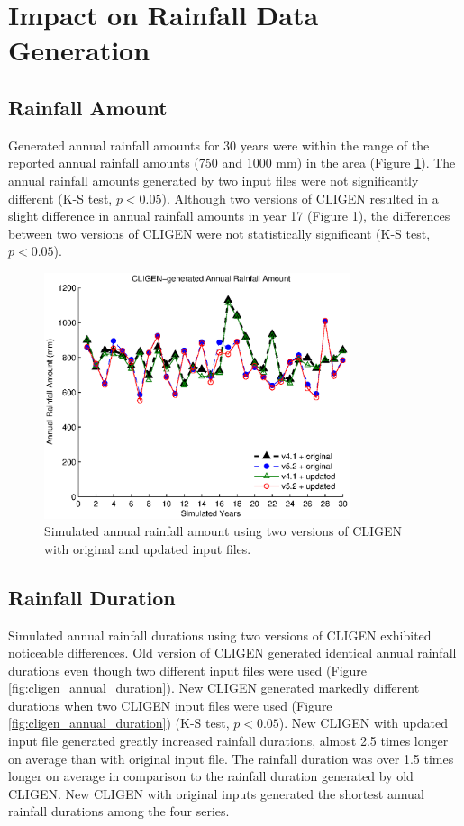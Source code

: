 \section{Impact on Rainfall Data Generation}
\label{sec:RainfallSimulation}

\subsection{Rainfall Amount}
Generated annual rainfall amounts for 30 years were within the range of the
reported annual rainfall amounts (750 and 1000 mm) in the area (Figure
\ref{fig:cligen_annual_amount}). The annual rainfall amounts generated by two
input files were not significantly different (K-S test, $p<0.05$). Although two
versions of CLIGEN resulted in a slight difference in annual rainfall amounts in
year 17 (Figure \ref{fig:cligen_annual_amount}), the differences between two
versions of CLIGEN were not statistically significant (K-S test, $p<0.05$).

\begin{figure}[htbp]
  \centering

\includegraphics[width=0.8\textwidth]{./img/cligen_annual_amount_series}
  \caption{Simulated annual rainfall amount using two versions of CLIGEN
with original and updated input files.}
  \label{fig:cligen_annual_amount}
\end{figure}

\subsection{Rainfall Duration}
Simulated annual rainfall durations using two versions of CLIGEN exhibited
noticeable differences. Old version of CLIGEN generated identical annual
rainfall durations even though two different input files were used (Figure
\ref{fig:cligen_annual_duration}). New CLIGEN generated markedly different
durations when two CLIGEN input files were used (Figure
\ref{fig:cligen_annual_duration}) (K-S test, $p<0.05$). New CLIGEN with updated
input file generated greatly increased rainfall durations, almost 2.5 times
longer on average than with original input file. The rainfall duration was over
1.5 times longer on average in comparison to the rainfall duration generated by
old CLIGEN. New CLIGEN with original inputs generated the shortest annual
rainfall durations among the four series.

